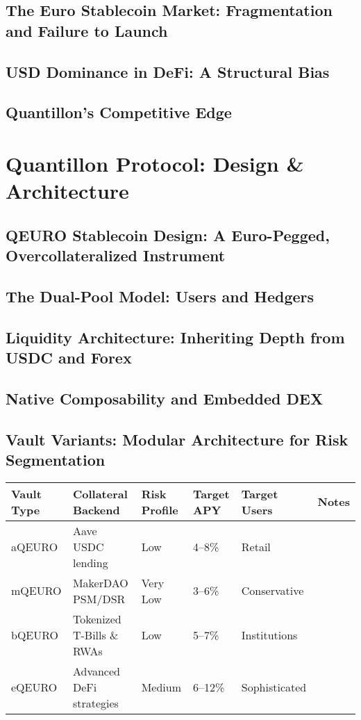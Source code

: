 \documentclass[12pt,a4paper]{report}
\begin{document}
\section{The Euro Stablecoin Market: Fragmentation and Failure to Launch}
\section{USD Dominance in DeFi: A Structural Bias}
\section{Quantillon’s Competitive Edge}

\chapter{Quantillon Protocol: Design \& Architecture}
\section{QEURO Stablecoin Design: A Euro-Pegged, Overcollateralized Instrument}
\section{The Dual-Pool Model: Users and Hedgers}
\section{Liquidity Architecture: Inheriting Depth from USDC and Forex}
\section{Native Composability and Embedded DEX}
\section{Vault Variants: Modular Architecture for Risk Segmentation}
\begin{longtable}{@{}llllll@{}}
\toprule
\textbf{Vault Type} & \textbf{Collateral Backend} & \textbf{Risk Profile} & \textbf{Target APY} & \textbf{Target Users} & \textbf{Notes} \\
\midrule
aQEURO & Aave USDC lending & Low & 4--8\% & Retail &  \\
mQEURO & MakerDAO PSM/DSR & Very Low & 3--6\% & Conservative &  \\
bQEURO & Tokenized T-Bills \& RWAs & Low & 5--7\% & Institutions &  \\
eQEURO & Advanced DeFi strategies & Medium & 6--12\% & Sophisticated &  \\
\bottomrule
\end{longtable}
\end{document}
